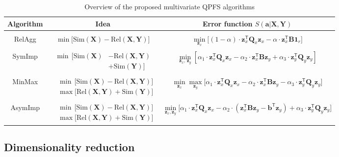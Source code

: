 \documentclass[12pt,twoside]{article}
\theoremstyle{definition}
\newcommand{\ba}{\mathbf{a}}
\newcommand{\bz}{\mathbf{z}}
\newcommand{\bb}{\mathbf{b}}
\newcommand{\bY}{\mathbf{Y}}
\newcommand{\bX}{\mathbf{X}}
\newcommand{\bB}{\mathbf{B}}
\newcommand{\bQ}{\mathbf{Q}}
\newcommand{\T}{\mathsf{T}}
\newcommand{\bOne}{\boldsymbol{1}}
\begin{document}
\begin{table}
	\centering
	\small{
		\begin{tabular}{c|c|c}
			\hline
			Algorithm & Idea & Error function $S(\ba | \bX, \bY)$ \\
			\hline && \\ [-.5em]
			RelAgg & $\min \bigl[ \text{Sim}(\bX) - \text{Rel}(\bX, \bY) \bigr] $ & $\min\limits_{\bz_x} \bigl[ (1 - \alpha) \cdot \bz_x^{\T} \bQ_x \bz_x - \alpha \cdot \bz_x^{\T} \bB \bOne_r \bigr] $ \\ &&\\[-.5em]
			SymImp & $\begin{aligned} \min \, \bigl[ \text{Sim}(\bX) & - \text{Rel}(\bX, \bY) \\ & + \text{Sim}(\bY) \bigr] \end{aligned}$ & $ \min\limits_{\bz_x, \, \bz_y} \left[ \alpha_1 \cdot \bz_x^{\T} \bQ_x \bz_x - \alpha_2 \cdot \bz_x^{\T} \bB \bz_y + \alpha_3 \cdot \bz_y^{\T} \bQ_y \bz_y \right] $\\ &&\\ [-.5em]
			MinMax & $\begin{aligned} &\min \, \bigl[ \text{Sim}(\bX) - \text{Rel}(\bX, \bY) \bigr]  \\ & \max \bigl[\text{Rel}(\bX, \bY) + \text{Sim}(\bY) \bigr] \end{aligned}$ & $	\min\limits_{\bz_x} 	\max\limits_{\bz_y} \bigl[\alpha_1 \cdot \bz_x^{\T} \bQ_x \bz_x - \alpha_2 \cdot \bz_x^{\T} \bB \bz_y - \alpha_3 \cdot \bz_y^{\T} \bQ_y \bz_y \bigr]$ \\ &&\\ [-.5em]
			AsymImp & $\begin{aligned} & \min \, \bigl[ \text{Sim}(\bX) - \text{Rel}(\bX, \bY) \bigr]\\ &  \max \bigl[\text{Rel}(\bX, \bY) + \text{Sim}(\bY) \bigr] \end{aligned}$ & $\min\limits_{\bz_x, \bz_y} \bigl[ \alpha_1 \cdot \bz_x^{\T} \bQ_x \bz_x - \alpha_2 \cdot \left(\bz_x^{\T} \bB \bz_y - \bb^{\T} \bz_y \right) + \alpha_3 \cdot \bz_y^{\T} \bQ_y \bz_y \bigr]$\\ 
			\hline
	\end{tabular}}
	\caption{Overview of the proposed multivariate QPFS algorithms}
	\label{tbl:summary}
\end{table}

\subsection{Dimensionality reduction}
\end{document}
